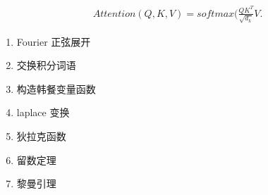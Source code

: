 \begin{thm}
		\begin{align*}
				Attention(Q,K,V) = softmax (\frac{QK^T}{\sqrt{d_k} } V
		.\end{align*}
\end{thm}
\begin{thm}[关于积分的菜谱]
		\begin{enumerate}
				\item Fourier 正弦展开
				\item 交换积分词语
				\item 构造韩餐变量函数
				\item laplace 变换
				\item 狄拉克函数
				\item 留数定理
				\item 黎曼引理
		\end{enumerate}
\end{thm}


\ifx\allfiles\undefined

\fi


